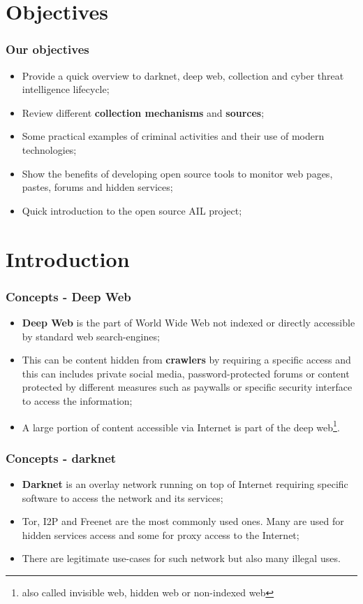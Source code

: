 \documentclass{beamer}
\begin{document}
\section{Objectives}
\begin{frame}
\frametitle{Our objectives}
    \begin{itemize}
        \item Provide a quick overview to darknet, deep web, collection and cyber threat intelligence lifecycle;
        \item Review different {\bf collection mechanisms} and {\bf sources};
        \item Some practical examples of criminal activities and their use of modern technologies;
        \item Show the benefits of developing open source tools to monitor web pages, pastes, forums and hidden services;
        \item Quick introduction to the open source AIL project;
    \end{itemize}
\end{frame}

\section{Introduction}
\begin{frame}
        \frametitle{Concepts - Deep Web}
        \begin{itemize}
                \item {\bf Deep Web} is the part of World Wide Web not indexed or directly accessible by standard web search-engines;
                \item This can be content hidden from {\bf crawlers} by requiring a specific access and this can includes private social media, password-protected forums or content protected
                        by different measures such as paywalls or specific security interface to access the information;
                \item A large portion of content accessible via Internet is part of the deep web\footnote{also called invisible web, hidden web or non-indexed web}.
        \end{itemize}
\end{frame}

\begin{frame}
        \frametitle{Concepts - darknet}
        \begin{itemize}
                \item {\bf Darknet} is an overlay network running on top of Internet requiring specific software to access the network and its services;
                \item Tor, I2P and Freenet are the most commonly used ones. Many are used for hidden services access and some for proxy access to the Internet;
                \item There are legitimate use-cases for such network but also many illegal uses.
        \end{itemize}
\end{frame}
\end{document}
